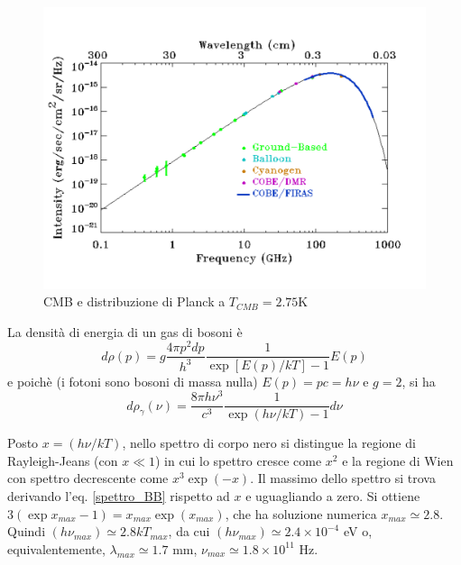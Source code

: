 \begin{figure}
  \centering{}
  \includegraphics[width=\textwidth]{figure/CMB_intensity.pdf}
  \caption{CMB e distribuzione di Planck a $T_{CMB} = 2.75$K}
  \label{fig:spettro_CMB}
\end{figure}
La densità di energia di un gas di bosoni è
\begin{equation}
  d \rho (p)  = g \frac{4 \pi p^2 dp} {h^3} \frac{1} {\exp[ E(p) / kT ]-1} E(p)
\end{equation}
e poichè (i fotoni sono bosoni di massa nulla) $E(p)=pc=h\nu$ e $g=2$, si ha
\begin{equation}
  d \rho_{\gamma}(\nu) =   \frac{8 \pi h \nu^3 } {c^3} \frac{1} {\exp(h \nu/ kT)
    -1} d\nu
  \label{spettro_BB}
\end{equation}

Posto $x=(h \nu/kT)$, nello spettro di corpo nero si distingue la regione di
Rayleigh-Jeans (con $x\ll 1$) in cui lo spettro cresce come $x^2$ e la regione
di Wien con spettro decrescente come $x^3 \exp(-x)$.  Il massimo dello spettro
si trova derivando l'eq.  \eqref{spettro_BB} rispetto ad $x$ e uguagliando a
zero.  Si ottiene $3(\exp x_{max} -1) = x_{max} \exp(x_{max})$, che ha soluzione
numerica $x_{max} \simeq 2.8$. Quindi $(h \nu_{max}) \simeq 2.8 kT_{max}$, da
cui $(h \nu_{max}) \simeq 2.4 \times 10^{-4}$ eV o, equivalentemente,
$\lambda_{max} \simeq 1.7$ mm, $\nu_{max} \simeq 1.8 \times 10^{11}$ Hz.

